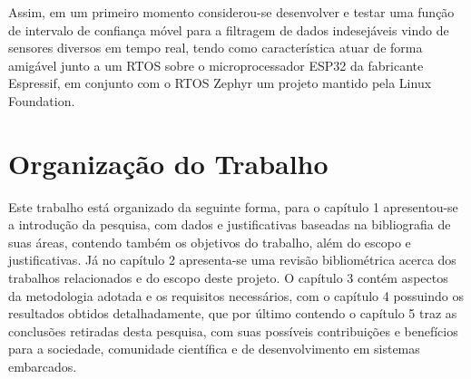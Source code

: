 Assim, em um primeiro momento considerou-se desenvolver e testar uma função de intervalo de confiança móvel para a filtragem de dados indesejáveis vindo de sensores diversos em tempo real, tendo como característica atuar de forma amigável junto a um RTOS sobre o microprocessador ESP32 da fabricante Espressif, em conjunto com o RTOS Zephyr um projeto mantido pela Linux Foundation.


\section{Organização do Trabalho}
Este trabalho está organizado da seguinte forma, para o capítulo 1 apresentou-se a introdução da pesquisa, com dados e justificativas baseadas na bibliografia de suas áreas, contendo também os objetivos do trabalho, além do escopo e justificativas. Já no capítulo 2 apresenta-se uma revisão bibliométrica acerca dos trabalhos relacionados e do escopo deste projeto. O capítulo 3 contém aspectos da metodologia adotada e os requisitos necessários, com o  capítulo 4 
possuindo os resultados obtidos detalhadamente, que por último contendo o capítulo 5 traz as conclusões retiradas desta pesquisa, com suas possíveis contribuições e benefícios para a sociedade, comunidade científica e de desenvolvimento em sistemas embarcados.
 

